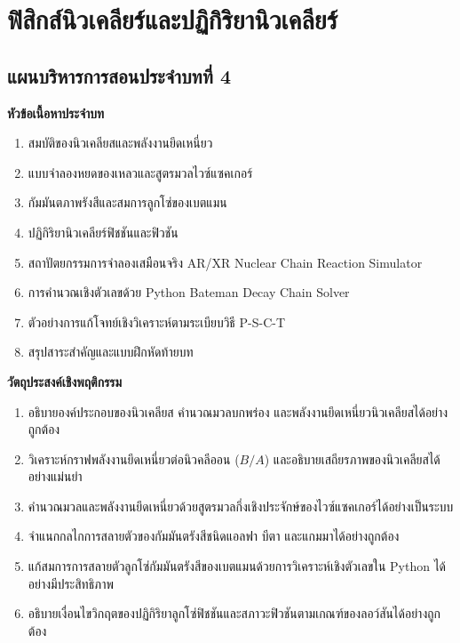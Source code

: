 \chapter{ฟิสิกส์นิวเคลียร์และปฏิกิริยานิวเคลียร์}
\label{chap:nuclear_physics}

\section*{แผนบริหารการสอนประจำบทที่ 4}


\begin{lessonplanbox}
\noindent\textbf{หัวข้อเนื้อหาประจำบท}
\begin{enumerate}
    \item สมบัติของนิวเคลียสและพลังงานยึดเหนี่ยว
    \item แบบจำลองหยดของเหลวและสูตรมวลไวซ์แซคเกอร์
    \item กัมมันตภาพรังสีและสมการลูกโซ่ของเบตแมน
    \item ปฏิกิริยานิวเคลียร์ฟิชชันและฟิวชัน
    \item สถาปัตยกรรมการจำลองเสมือนจริง AR/XR Nuclear Chain Reaction Simulator
    \item การคำนวณเชิงตัวเลขด้วย Python Bateman Decay Chain Solver
    \item ตัวอย่างการแก้โจทย์เชิงวิเคราะห์ตามระเบียบวิธี P-S-C-T
    \item สรุปสาระสำคัญและแบบฝึกหัดท้ายบท
\end{enumerate}

\noindent\textbf{วัตถุประสงค์เชิงพฤติกรรม}
\begin{enumerate}
    \item อธิบายองค์ประกอบของนิวเคลียส คำนวณมวลบกพร่อง และพลังงานยึดเหนี่ยวนิวเคลียสได้อย่างถูกต้อง
    \item วิเคราะห์กราฟพลังงานยึดเหนี่ยวต่อนิวคลีออน ($B/A$) และอธิบายเสถียรภาพของนิวเคลียสได้อย่างแม่นยำ
    \item คำนวณมวลและพลังงานยึดเหนี่ยวด้วยสูตรมวลกึ่งเชิงประจักษ์ของไวซ์แซคเกอร์ได้อย่างเป็นระบบ
    \item จำแนกกลไกการสลายตัวของกัมมันตรังสีชนิดแอลฟา บีตา และแกมมาได้อย่างถูกต้อง
    \item แก้สมการการสลายตัวลูกโซ่กัมมันตรังสีของเบตแมนด้วยการวิเคราะห์เชิงตัวเลขใน Python ได้อย่างมีประสิทธิภาพ
    \item อธิบายเงื่อนไขวิกฤตของปฏิกิริยาลูกโซ่ฟิชชันและสภาวะฟิวชันตามเกณฑ์ของลอว์สันได้อย่างถูกต้อง
\end{enumerate}


\end{lessonplanbox}

